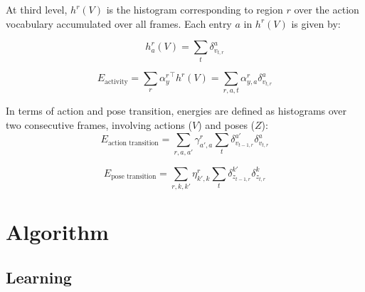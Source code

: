 \documentclass[10pt,letterpaper]{article}
\newcommand{\+}[1]{\ensuremath{{\boldsymbol #1}}}
\begin{document}
At third level, $h^{r}(V)$ is the histogram corresponding to region $r$ over
the action vocabulary accumulated over all frames. Each entry $a$ in $h^{r}(V)$ is
given by:

\begin{equation}
h_a^{r}(V) = \sum_{t} \delta_{v_{t,r}}^a
\end{equation}

\begin{equation}
E_{\text{activity}} = \sum_{r} {\alpha^r_{y}}^\top h^{r}(V) = \sum_{r,a,t}  \alpha^r_{y,a} \delta_{v_{t,r}}^a
\end{equation}

In terms of action and pose transition, energies are defined
as histograms over two consecutive frames,
involving actions ($V$) and poses ($Z$):
\begin{equation}
E_{\text{action transition}} = \sum_{r,a,a'}  \gamma^r_{a',a} \sum_{t} \delta_{v_{t-1,r}}^{a'}\delta_{v_{t,r}}^a 
\end{equation}

\begin{equation}
E_{\text{pose transition}} =\sum_{r,k,k'}  \eta^r_{k',k}\sum_{t}\delta_{z_{t-1,r}}^{k'}\delta_{z_{t,r}}^{k}
\end{equation}


\vspace{0.3cm}



\section{Algorithm}

\subsection{Learning}
\end{document}
